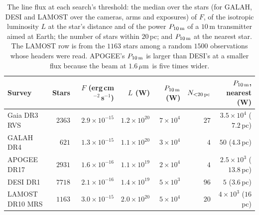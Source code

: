 \documentclass[3p,11pt]{elsarticle}
\newcommand{\um}{\,$\mu$m}
\begin{document}
\begin{table}[tp]
\centering\small
\setlength{\tabcolsep}{4pt}
\caption{The line flux at each search's threshold: the median over the stars (for
GALAH, DESI and LAMOST over the cameras, arms and exposures) of $F$, of the isotropic
luminosity $L$ at the star's distance and of the power $P_{10\,\rm m}$ of a $10$\,m
transmitter aimed at Earth; the number of stars within $20$\,pc; and $P_{10\,\rm m}$ at
the nearest star. The LAMOST row is from the $1163$ stars among a random $1500$
observations whose headers were read. APOGEE's $P_{10\,\rm m}$ is larger than DESI's at
a smaller flux because the beam at $1.6$\um\ is five times wider.}
\label{tab:limits}
\begin{tabular}{l r r r r r r}
\toprule
Survey & Stars & $F$ (erg\,cm$^{-2}$\,s$^{-1}$) & $L$ (W) & $P_{10\,\rm m}$ (W) & $N_{<20\,\rm pc}$ & $P_{10\,\rm m}$, nearest (W) \\
\midrule
Gaia DR3 RVS & $2363$ & $2.9\times10^{-15}$ & $1.2\times10^{20}$ & $7\times10^{4}$ & $27$ & $3.5\times10^{4}$ ($7.2$\,pc) \\
GALAH DR4 & $621$ & $1.3\times10^{-15}$ & $1.1\times10^{20}$ & $3\times10^{4}$ & $4$ & $50$ ($4.3$\,pc) \\
APOGEE DR17 & $2931$ & $1.6\times10^{-16}$ & $1.1\times10^{19}$ & $2\times10^{4}$ & $4$ & $2.5\times10^{3}$ ($13.8$\,pc) \\
DESI DR1 & $7718$ & $2.1\times10^{-16}$ & $1.4\times10^{19}$ & $5\times10^{3}$ & $96$ & $5$ ($3.6$\,pc) \\
LAMOST DR10 MRS & $1163$ & $3.0\times10^{-15}$ & $2.0\times10^{20}$ & $5\times10^{4}$ & $20$ & $4\times10^{3}$ ($16$\,pc) \\
\bottomrule
\end{tabular}
\end{table}
\end{document}
